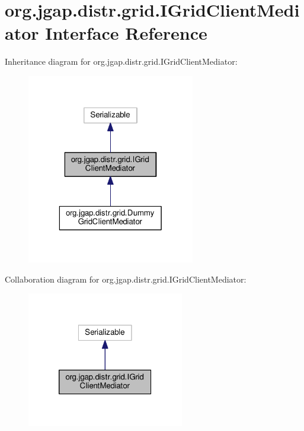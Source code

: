 \hypertarget{interfaceorg_1_1jgap_1_1distr_1_1grid_1_1_i_grid_client_mediator}{\section{org.\-jgap.\-distr.\-grid.\-I\-Grid\-Client\-Mediator Interface Reference}
\label{interfaceorg_1_1jgap_1_1distr_1_1grid_1_1_i_grid_client_mediator}
}


Inheritance diagram for org.\-jgap.\-distr.\-grid.\-I\-Grid\-Client\-Mediator\-:
\nopagebreak
\begin{figure}[H]
\begin{center}
\leavevmode
\includegraphics[width=208pt]{interfaceorg_1_1jgap_1_1distr_1_1grid_1_1_i_grid_client_mediator__inherit__graph}
\end{center}
\end{figure}


Collaboration diagram for org.\-jgap.\-distr.\-grid.\-I\-Grid\-Client\-Mediator\-:
\nopagebreak
\begin{figure}[H]
\begin{center}
\leavevmode
\includegraphics[width=194pt]{interfaceorg_1_1jgap_1_1distr_1_1grid_1_1_i_grid_client_mediator__coll__graph}
\end{center}
\end{figure}
